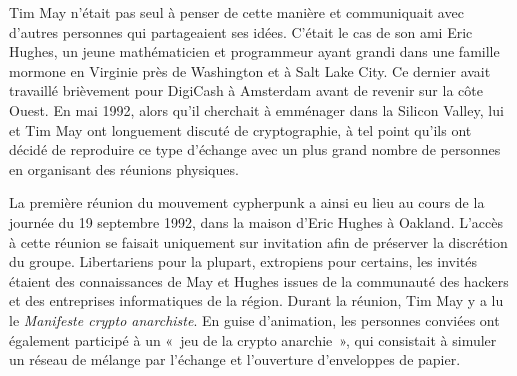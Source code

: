 Tim May n'était pas seul à penser de cette manière et communiquait avec d'autres personnes qui partageaient ses idées. C'était le cas de son ami Eric Hughes, un jeune mathématicien et programmeur ayant grandi dans une famille mormone en Virginie près de Washington et à Salt Lake City. Ce dernier avait travaillé brièvement pour DigiCash à Amsterdam avant de revenir sur la côte Ouest. En mai 1992, alors qu'il cherchait à emménager dans la Silicon Valley, lui et Tim May ont longuement discuté de cryptographie, à tel point qu'ils ont décidé de reproduire ce type d'échange avec un plus grand nombre de personnes en organisant des réunions physiques. %

La première réunion du mouvement cypherpunk a ainsi eu lieu au cours de la journée du 19 septembre 1992, dans la maison d'Eric Hughes à Oakland. L'accès à cette réunion se faisait uniquement sur invitation afin de préserver la discrétion du groupe. Libertariens pour la plupart, extropiens pour certains, les invités étaient des connaissances de May et Hughes issues de la communauté des hackers et des entreprises informatiques de la région. Durant la réunion, Tim May y a lu le \emph{Manifeste crypto anarchiste}. En guise d'animation, les personnes conviées ont également participé à un «~jeu de la crypto anarchie~», qui consistait à simuler un réseau de mélange par l'échange et l'ouverture d'enveloppes de papier.

